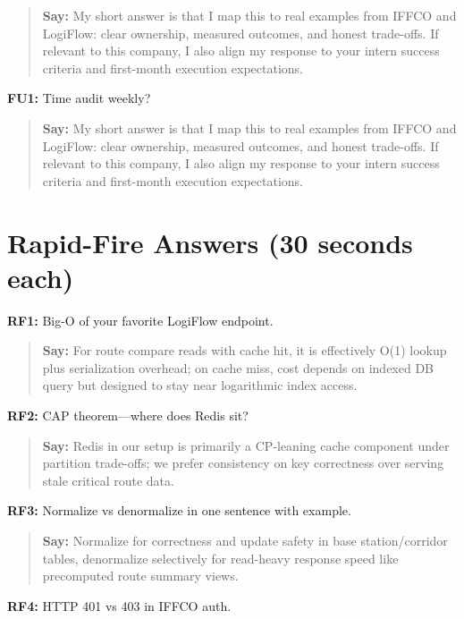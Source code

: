 \documentclass[9pt,a4paper]{article}
\begin{document}
\begin{quote}\small\textbf{Say:} My short answer is that I map this to real examples from IFFCO and LogiFlow: clear ownership, measured outcomes, and honest trade-offs. If relevant to this company, I also align my response to your intern success criteria and first-month execution expectations.\end{quote}
\vspace{2mm}
\textbf{FU1:} Time audit weekly?

\begin{quote}\small\textbf{Say:} My short answer is that I map this to real examples from IFFCO and LogiFlow: clear ownership, measured outcomes, and honest trade-offs. If relevant to this company, I also align my response to your intern success criteria and first-month execution expectations.\end{quote}
\vspace{2mm}
\newpage\section{Rapid-Fire Answers (30 seconds each)}
\textbf{RF1:} Big-O of your favorite LogiFlow endpoint.

\begin{quote}\small\textbf{Say:} For route compare reads with cache hit, it is effectively O(1) lookup plus serialization overhead; on cache miss, cost depends on indexed DB query but designed to stay near logarithmic index access.\end{quote}
\vspace{2mm}
\textbf{RF2:} CAP theorem---where does Redis sit?

\begin{quote}\small\textbf{Say:} Redis in our setup is primarily a CP-leaning cache component under partition trade-offs; we prefer consistency on key correctness over serving stale critical route data.\end{quote}
\vspace{2mm}
\textbf{RF3:} Normalize vs denormalize in one sentence with example.

\begin{quote}\small\textbf{Say:} Normalize for correctness and update safety in base station/corridor tables, denormalize selectively for read-heavy response speed like precomputed route summary views.\end{quote}
\vspace{2mm}
\textbf{RF4:} HTTP 401 vs 403 in IFFCO auth.
\end{document}
